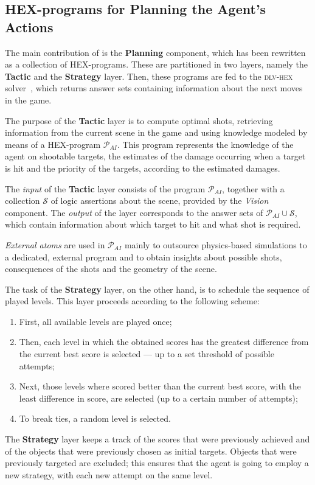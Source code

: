 \subsection{HEX-programs for Planning the Agent's Actions}

The main contribution of \ah is the \textbf{Planning} component, which has
been rewritten as a collection of HEX-programs.
These are partitioned in two layers, namely
the \textbf{Tactic} and the \textbf{Strategy} layer.
Then, these programs are fed to the
\textsc{dlv-hex} solver~\cite{dlvHEX},
which returns answer sets containing
information about the next moves in the game.

The purpose of the \textbf{Tactic} layer is to compute optimal shots, retrieving information from the current scene in the game and using knowledge modeled by means of a HEX-program \(\mathcal{P}_{AI}\).
This program represents the knowledge of the agent on shootable targets, the estimates of the damage occurring when a target is hit and the priority of the targets, according to the estimated damages.

The \emph{input} of the \textbf{Tactic} layer consists of the program \(\mathcal{P}_{AI}\), together with a collection \(\mathcal{S}\) of logic assertions about the scene, provided by the \emph{Vision} component.
The \emph{output} of the layer corresponds to the answer sets of \(\mathcal{P}_{AI} \cup \mathcal{S}\), which contain information about which target to hit and what shot is required.

\emph{External atoms} are used in \(\mathcal{P}_{AI}\) mainly to outsource physics-based simulations to a dedicated, external program and to obtain insights about possible shots, consequences of the shots and the geometry of the scene.

The task of the \textbf{Strategy} layer, on the other hand, is to schedule the sequence of played levels. This layer proceeds according to the following scheme:
\begin{enumerate}
    \item First, all available levels are played once;
    \item Then, each level in which the obtained scores has the greatest difference from the current best score is selected --- up to a set threshold of possible attempts;
    \item Next, those levels where \ah scored better than the current best score, with the least difference in score, are selected (up to a certain number of attempts);
    \item To break ties, a random level is selected.
\end{enumerate}

The \textbf{Strategy} layer keeps a track of the scores that were previously achieved and of the objects that were previously chosen as initial targets.
Objects that were previously targeted are excluded; this ensures that the agent is going to employ a new strategy, with each new attempt on the same level.